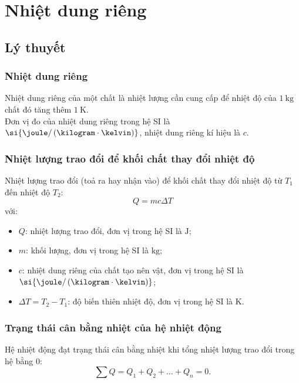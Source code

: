 \let\lesson\undefined
\newcommand{\lesson}{\phantomlesson{Bài 4: Nhiệt dung riêng, nhiệt nóng chảy riêng, nhiệt hoá hơi riêng}}
\chapter[Nhiệt dung riêng]{Nhiệt dung riêng}
\section{Lý thuyết}
\subsection{Nhiệt dung riêng}
Nhiệt dung riêng của một chất là nhiệt lượng cần cung cấp để nhiệt độ của $\SI{1}{\kilogram}$ chất đó tăng thêm $\SI{1}{\kelvin}$.\\
Đơn vị đo của nhiệt dung riêng trong hệ SI là $\si{\joule/\left(\kilogram\cdot\kelvin\right)}$, nhiệt dung riêng kí hiệu là $c$.
\subsection{Nhiệt lượng trao đổi để khối chất thay đổi nhiệt độ}
Nhiệt lượng trao đổi (toả ra hay nhận vào) để khối chất thay đổi nhiệt độ từ $T_1$ đến nhiệt độ $T_2$:
$$Q=mc\Delta T$$
với:
\begin{itemize}
	\item $Q$: nhiệt lượng trao đổi, đơn vị trong hệ SI là $\si{\joule}$;
	\item $m$: khối lượng, đơn vị trong hệ SI là $\si{\kilogram}$;
	\item $c$: nhiệt dung riêng của chất tạo nên vật, đơn vị trong hệ SI là $\si{\joule/\left(\kilogram\cdot\kelvin\right)}$;
	\item $\Delta T=T_2-T_1$: độ biến thiên nhiệt độ, đơn vị trong hệ SI là $\si{\kelvin}$.
\end{itemize}
\subsection{Trạng thái cân bằng nhiệt của hệ nhiệt động}
Hệ nhiệt động đạt trạng thái cân bằng nhiệt khi tổng nhiệt lượng trao đổi trong hệ bằng 0:
$$\sum Q=Q_1+Q_2+\dots+Q_n=0.$$
